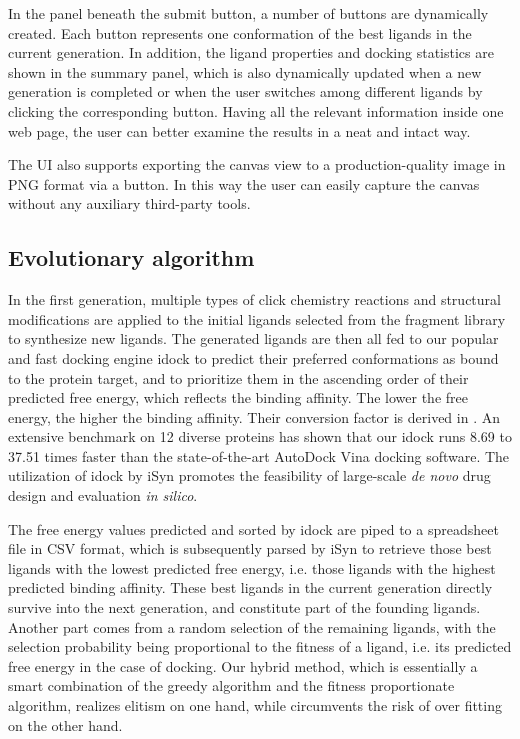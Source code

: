 In the panel beneath the submit button, a number of buttons are dynamically created. Each button represents one conformation of the best ligands in the current generation. In addition, the ligand properties and docking statistics are shown in the summary panel, which is also dynamically updated when a new generation is completed or when the user switches among different ligands by clicking the corresponding button. Having all the relevant information inside one web page, the user can better examine the results in a neat and intact way.

The UI also supports exporting the canvas view to a production-quality image in PNG format via a button. In this way the user can easily capture the canvas without any auxiliary third-party tools.

\subsection{Evolutionary algorithm}

In the first generation, multiple types of click chemistry reactions and structural modifications are applied to the initial ligands selected from the fragment library to synthesize new ligands. The generated ligands are then all fed to our popular and fast docking engine idock \citep{1153} to predict their preferred conformations as bound to the protein target, and to prioritize them in the ascending order of their predicted free energy, which reflects the binding affinity. The lower the free energy, the higher the binding affinity. Their conversion factor is derived in \citep{1362}. An extensive benchmark on 12 diverse proteins \citep{1362} has shown that our idock \citep{1153} runs 8.69 to 37.51 times faster than the state-of-the-art AutoDock Vina \citep{595} docking software. The utilization of idock by iSyn promotes the feasibility of large-scale \textit{de novo} drug design and evaluation \textit{in silico}.

The free energy values predicted and sorted by idock are piped to a spreadsheet file in CSV format, which is subsequently parsed by iSyn to retrieve those best ligands with the lowest predicted free energy, i.e. those ligands with the highest predicted binding affinity. These best ligands in the current generation directly survive into the next generation, and constitute part of the founding ligands. Another part comes from a random selection of the remaining ligands, with the selection probability being proportional to the fitness of a ligand, i.e. its predicted free energy in the case of docking. Our hybrid method, which is essentially a smart combination of the greedy algorithm and the fitness proportionate algorithm, realizes elitism on one hand, while circumvents the risk of over fitting on the other hand.

